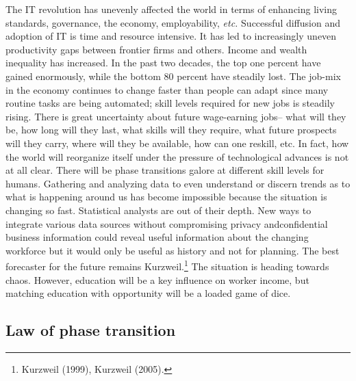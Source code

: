 \begin{multicols}{2}
The IT revolution has unevenly affected the world in terms of enhancing living standards, governance, the economy, employability, \textit{etc.} Successful diffusion and adoption of IT is time and resource intensive. It has led to increasingly uneven productivity gaps between frontier firms and others. Income and wealth inequality has increased. In the past two decades, the top one percent have gained enormously, while the bottom 80 percent have steadily lost. The job-mix in the economy continues to change faster than people can adapt since many routine tasks are being automated; skill levels required for new jobs is steadily rising. There is great uncertainty about future wage-earning jobs-- what will they be, how long will they last, what skills will they require, what future prospects will they carry, where will they be available, how can one reskill, etc. In fact, how the world will reorganize itself under the pressure of technological advances is not at all clear. There will be phase transitions galore at different skill levels for humans. Gathering and analyzing data to even understand or discern trends as to what is happening around us has become impossible because the situation is changing so fast. Statistical analysts are out of their depth. New ways to integrate various data sources without compromising privacy and\break confidential business information could reveal useful information about the changing workforce but it would only be useful as history and not for planning. The best forecaster for the future remains Kurzweil.\footnote{Kurzweil (1999), Kurzweil (2005).} The situation is heading towards chaos. However, education will be a key influence on worker income, but matching education with opportunity will be a loaded game of dice.

\subsection*{Law of phase transition}


\end{multicols}
